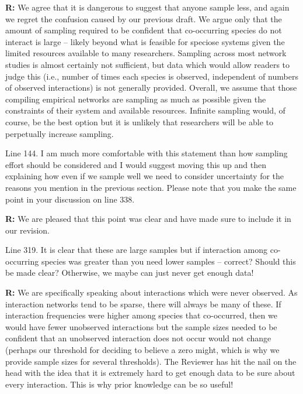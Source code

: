 \documentclass[12pt]{letter}
\newenvironment{refquote}{\bigskip \begin{it}}{\end{it}\smallskip}
\begin{document}
		\textbf{R:} We agree that it is dangerous to suggest that anyone sample less, and again we regret the confusion caused by our previous draft. We argue only that the amount of sampling required to be confident that co-occurring species do not interact is large -- likely beyond what is feasible for speciose systems given the limited resources available to many researchers. Sampling across most network studies is almost certainly not sufficient, but data which would allow readers to judge this (i.e., number of times each species is observed, independent of numbers of observed interactions) is not generally provided. Overall, we assume that those compiling empirical networks are sampling as much as possible given the constraints of their system and available resources. Infinite sampling would, of course, be the best option but it is unlikely that researchers will be able to perpetually increase sampling.


		\begin{refquote}
		Line 144.  I am much more comfortable with this statement than how sampling effort should be considered and I would suggest moving this up and then explaining how even if we sample well we need to consider uncertainty for the reasons you mention in the previous section.  Please note that you make the same point in your discussion on line 338.
		\end{refquote}


		\textbf{R:} We are pleased that this point was clear and have made sure to include it in our revision.


		\begin{refquote}
		Line 319.  It is clear that these are large samples but if interaction among co-occurring species was greater than you need lower samples – correct?  Should this be made clear?  Otherwise, we maybe can just never get enough data!
		\end{refquote}


		\textbf{R:} We are specifically speaking about interactions which were never observed. As interaction networks tend to be sparse, there will always be many of these. If interaction frequencies were higher among species that co-occurred, then we would have fewer unobserved interactions but the sample sizes needed to be confident that an unobserved interaction does not occur would not change (perhaps our threshold for deciding to believe a zero might, which is why we provide sample sizes for several thresholds). The Reviewer has hit the nail on the head with the idea that it is extremely hard to get enough data to be sure about every interaction. This is why prior knowledge can be so useful!
\end{document}
